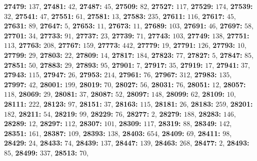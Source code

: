 \textsf{\bfseries 27479:} $137$, \textsf{\bfseries 27481:} $42$, \textsf{\bfseries 27487:} $45$, \textsf{\bfseries 27509:} $82$, \textsf{\bfseries 27527:} $117$, \textsf{\bfseries 27529:} $174$, \textsf{\bfseries 27539:} $32$, \textsf{\bfseries 27541:} $47$, \textsf{\bfseries 27551:} $61$, \textsf{\bfseries 27581:} $13$, \textsf{\bfseries 27583:} $235$, \textsf{\bfseries 27611:} $116$, \textsf{\bfseries 27617:} $45$, \textsf{\bfseries 27631:} $89$, \textsf{\bfseries 27647:} $5$, \textsf{\bfseries 27653:} $11$, \textsf{\bfseries 27673:} $11$, \textsf{\bfseries 27689:} $103$, \textsf{\bfseries 27691:} $46$, \textsf{\bfseries 27697:} $58$, \textsf{\bfseries 27701:} $34$, \textsf{\bfseries 27733:} $91$, \textsf{\bfseries 27737:} $23$, \textsf{\bfseries 27739:} $71$, \textsf{\bfseries 27743:} $103$, \textsf{\bfseries 27749:} $138$, \textsf{\bfseries 27751:} $113$, \textsf{\bfseries 27763:} $208$, \textsf{\bfseries 27767:} $159$, \textsf{\bfseries 27773:} $442$, \textsf{\bfseries 27779:} $19$, \textsf{\bfseries 27791:} $126$, \textsf{\bfseries 27793:} $10$, \textsf{\bfseries 27799:} $29$, \textsf{\bfseries 27803:} $22$, \textsf{\bfseries 27809:} $14$, \textsf{\bfseries 27817:} $184$, \textsf{\bfseries 27823:} $77$, \textsf{\bfseries 27827:} $5$, \textsf{\bfseries 27847:} $85$, \textsf{\bfseries 27851:} $50$, \textsf{\bfseries 27883:} $29$, \textsf{\bfseries 27893:} $95$, \textsf{\bfseries 27901:} $7$, \textsf{\bfseries 27917:} $35$, \textsf{\bfseries 27919:} $17$, \textsf{\bfseries 27941:} $37$, \textsf{\bfseries 27943:} $115$, \textsf{\bfseries 27947:} $26$, \textsf{\bfseries 27953:} $214$, \textsf{\bfseries 27961:} $76$, \textsf{\bfseries 27967:} $312$, \textsf{\bfseries 27983:} $135$, \textsf{\bfseries 27997:} $42$, \textsf{\bfseries 28001:} $199$, \textsf{\bfseries 28019:} $70$, \textsf{\bfseries 28027:} $56$, \textsf{\bfseries 28031:} $76$, \textsf{\bfseries 28051:} $12$, \textsf{\bfseries 28057:} $118$, \textsf{\bfseries 28069:} $29$, \textsf{\bfseries 28081:} $37$, \textsf{\bfseries 28087:} $52$, \textsf{\bfseries 28097:} $148$, \textsf{\bfseries 28099:} $62$, \textsf{\bfseries 28109:} $10$, \textsf{\bfseries 28111:} $222$, \textsf{\bfseries 28123:} $97$, \textsf{\bfseries 28151:} $37$, \textsf{\bfseries 28163:} $115$, \textsf{\bfseries 28181:} $26$, \textsf{\bfseries 28183:} $259$, \textsf{\bfseries 28201:} $182$, \textsf{\bfseries 28211:} $54$, \textsf{\bfseries 28219:} $99$, \textsf{\bfseries 28229:} $76$, \textsf{\bfseries 28277:} $2$, \textsf{\bfseries 28279:} $188$, \textsf{\bfseries 28283:} $146$, \textsf{\bfseries 28289:} $12$, \textsf{\bfseries 28297:} $112$, \textsf{\bfseries 28307:} $101$, \textsf{\bfseries 28309:} $117$, \textsf{\bfseries 28319:} $88$, \textsf{\bfseries 28349:} $142$, \textsf{\bfseries 28351:} $161$, \textsf{\bfseries 28387:} $109$, \textsf{\bfseries 28393:} $138$, \textsf{\bfseries 28403:} $654$, \textsf{\bfseries 28409:} $69$, \textsf{\bfseries 28411:} $98$, \textsf{\bfseries 28429:} $24$, \textsf{\bfseries 28433:} $74$, \textsf{\bfseries 28439:} $137$, \textsf{\bfseries 28447:} $139$, \textsf{\bfseries 28463:} $268$, \textsf{\bfseries 28477:} $2$, \textsf{\bfseries 28493:} $85$, \textsf{\bfseries 28499:} $337$, \textsf{\bfseries 28513:} $70$, 
